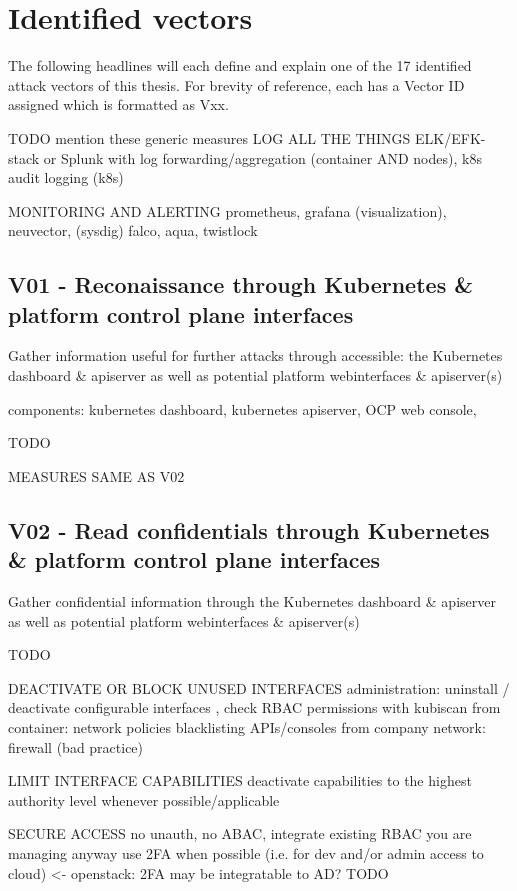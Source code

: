 \section{Identified vectors}
The following headlines will each define and explain one of the 17 identified attack vectors of this thesis. For brevity of reference, each has a Vector ID assigned which is formatted as Vxx.

TODO mention these generic measures
LOG ALL THE THINGS
	ELK/EFK-stack or Splunk with log forwarding/aggregation (container AND nodes), k8s audit logging (k8s)
	
MONITORING AND ALERTING
	prometheus, grafana (visualization), neuvector, (sysdig) falco, aqua, twistlock


\subsection{V01 - Reconaissance through Kubernetes \& platform control plane interfaces}
Gather information useful for further attacks through accessible: the Kubernetes dashboard \& apiserver as well as potential platform webinterfaces \& apiserver(s)

components: kubernetes dashboard, kubernetes apiserver, OCP web console, 

TODO

MEASURES SAME AS V02

\subsection{V02 - Read confidentials through Kubernetes \& platform control plane interfaces}
Gather confidential information through the Kubernetes dashboard \& apiserver as well as potential platform webinterfaces \& apiserver(s)

TODO

DEACTIVATE OR BLOCK UNUSED INTERFACES
	administration: uninstall / deactivate configurable interfaces , check RBAC permissions with kubiscan
	from container: network policies blacklisting APIs/consoles
	from company network: firewall (bad practice)
	
	
LIMIT INTERFACE CAPABILITIES
	deactivate capabilities to the highest authority level  whenever possible/applicable
	
SECURE ACCESS
	no unauth, no ABAC, integrate existing RBAC you are managing anyway
	use 2FA when possible (i.e. for dev and/or admin access to cloud) <- openstack: 2FA may be integratable to AD? TODO
	
